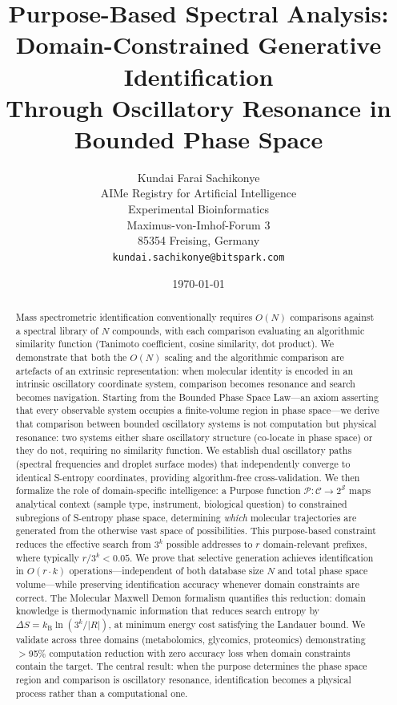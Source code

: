 \documentclass[11pt,twocolumn,a4paper]{article}
\title{%
  \textbf{Purpose-Based Spectral Analysis:}\\[4pt]
  \textbf{Domain-Constrained Generative Identification}\\[4pt]
  \textbf{Through Oscillatory Resonance in Bounded Phase Space}%
}
\author{
Kundai Farai Sachikonye\\
AIMe Registry for Artificial Intelligence\\
Experimental Bioinformatics\\
Maximus-von-Imhof-Forum 3\\
85354 Freising, Germany\\
\texttt{kundai.sachikonye@bitspark.com}
}
\date{\today}
\theoremstyle{definition}
\theoremstyle{remark}
\newcommand{\kB}{k_{\mathrm{B}}}
\newcommand{\Sspace}{\mathcal{S}}
\newcommand{\Purpose}{\mathcal{P}}
\newcommand{\Context}{\mathcal{C}}
\begin{document}
\maketitle

\begin{abstract}
Mass spectrometric identification conventionally requires $O(N)$ comparisons against a spectral library of $N$ compounds, with each comparison evaluating an algorithmic similarity function (Tanimoto coefficient, cosine similarity, dot product). We demonstrate that both the $O(N)$ scaling and the algorithmic comparison are artefacts of an extrinsic representation: when molecular identity is encoded in an intrinsic oscillatory coordinate system, comparison becomes resonance and search becomes navigation. Starting from the Bounded Phase Space Law---an axiom asserting that every observable system occupies a finite-volume region in phase space---we derive that comparison between bounded oscillatory systems is not computation but physical resonance: two systems either share oscillatory structure (co-locate in phase space) or they do not, requiring no similarity function. We establish dual oscillatory paths (spectral frequencies and droplet surface modes) that independently converge to identical S-entropy coordinates, providing algorithm-free cross-validation. We then formalize the role of domain-specific intelligence: a Purpose function $\Purpose\colon \Context \to 2^{\Sspace}$ maps analytical context (sample type, instrument, biological question) to constrained subregions of S-entropy phase space, determining \emph{which} molecular trajectories are generated from the otherwise vast space of possibilities. This purpose-based constraint reduces the effective search from $3^k$ possible addresses to $r$ domain-relevant prefixes, where typically $r/3^k < 0.05$. We prove that selective generation achieves identification in $O(r \cdot k)$ operations---independent of both database size $N$ and total phase space volume---while preserving identification accuracy whenever domain constraints are correct. The Molecular Maxwell Demon formalism quantifies this reduction: domain knowledge is thermodynamic information that reduces search entropy by $\Delta S = \kB \ln(3^k / |R|)$, at minimum energy cost satisfying the Landauer bound. We validate across three domains (metabolomics, glycomics, proteomics) demonstrating $>$95\% computation reduction with zero accuracy loss when domain constraints contain the target. The central result: when the purpose determines the phase space region and comparison is oscillatory resonance, identification becomes a physical process rather than a computational one.
\end{abstract}
\end{document}
